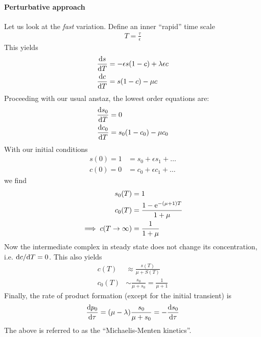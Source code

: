 \paragraph{Perturbative approach} Let us look at the \emph{fast} variation. Define an inner ``rapid'' time scale
\begin{gather*}
T = \frac{\tau}{\epsilon}
\end{gather*} 
This yields
\begin{align*}
\frac{\mathrm{d} s}{\mathrm{d} T} &= -\epsilon s(1-c) + \lambda \epsilon c \\
\frac{\mathrm{d} c}{\mathrm{d} T} &= s(1-c) - \mu c
\end{align*}
Proceeding with our usual anstaz, the lowest order equations are:
\begin{align*}
\frac{\mathrm{d} s_0}{\mathrm{d} T} &= 0 \\
\frac{\mathrm{d} c_0}{\mathrm{d} T} &= s_0 (1-c_0) - \mu c_0
\end{align*}
With our initial conditions
\begin{align*}
s(0) = 1 &= s_0 + \epsilon s_1 + \dots \\
c(0) = 0 &= c_0 + \epsilon c_1 + \dots 
\end{align*}
we find
\begin{align*}
s_0(T) & = 1 \\
c_0(T) &= \frac{1 - \mathrm{e}^{-(\mu+1)T}}{1+\mu} \\
\implies c(T\rightarrow \infty) &= \frac{1}{1+\mu}
\end{align*}
Now the intermediate complex in steady state does not change its concentration, i.e. $\mathrm{d} c/\mathrm{d} T = 0$. This also yields
\begin{align*}
c(T) &\approx \frac{s(T)}{\mu + S(T)} \\
c_0(T) &\sim  \frac{s_0}{\mu + s_0} =  \frac{1}{\mu + 1}
\end{align*}
Finally, the rate of product formation (except for the initial transient) is
\begin{align*}
\frac{\mathrm{d} p_0}{\mathrm{d} \tau } = (\mu -\lambda) \frac{s_0}{\mu + s_0} = - \frac{\mathrm{d} s_0}{\mathrm{d} \tau }
\end{align*}
The above is referred to as the ``Michaelis-Menten kinetics''. 

